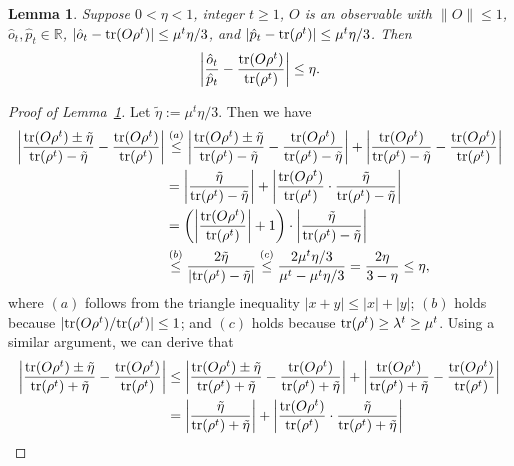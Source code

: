 \documentclass[aps,prl,twocolumn,nofootinbib,superscriptaddress,10pt]{revtex4-2}
\let\originalleft\left
\let\originalright\right
\renewcommand{\left}{\mathopen{}\mathclose\bgroup\originalleft}
\renewcommand{\right}{\aftergroup\egroup\originalright}
\def\R{ \mathbb{R} }
\newcommand{\tr}[1]{\mathrm{tr}\left( #1 \right)}
\theoremstyle{plain}
\newtheorem{lemma}{Lemma}
\theoremstyle{definition}
\newcommand{\lref}[1]{Lemma~\ref{#1}}
\begin{document}
\begin{lemma}\label{lem:PrincErrorB}
	Suppose $0<\eta<1$, integer $t\geq 1$, $O$ is an observable with $\|O\|\leq 1$, $\hat{o}_t,\hat{p}_t\in\R$, 
	$|\hat{o}_t-\tr{O\rho^t}|\leq \mu^t\eta/3$, and $|\hat{p}_t-\tr{\rho^t}|\leq \mu^t\eta/3$. Then 
	\begin{align}
		\left| \frac{\hat{o}_t}{\hat{p}_t} - \frac{\tr{O\rho^t}}{\tr{\rho^t}} \right| \leq \eta. 
	\end{align}
\end{lemma}

\begin{proof}[Proof of \lref{lem:PrincErrorB}]
	Let $\tilde\eta:=\mu^t\eta/3$. Then we have 
	\begin{align}
		\left| \frac{\tr{O\rho^t}\pm \tilde\eta }{\tr{\rho^t}-\tilde\eta} - \frac{\tr{O\rho^t}}{\tr{\rho^t}} \right|
		&
		\stackrel{(a)}{\leq} 
		\left| \frac{\tr{O\rho^t}\pm\tilde\eta }{\tr{\rho^t}-\tilde\eta}-\frac{\tr{O\rho^t} }{\tr{\rho^t}-\tilde\eta} \right|
		+ \left|\frac{\tr{O\rho^t} }{\tr{\rho^t}-\tilde\eta}-\frac{\tr{O\rho^t}}{\tr{\rho^t}} \right|
		\nonumber\\
		&=
		\left| \frac{\tilde\eta }{\tr{\rho^t}-\tilde\eta}\right|
		+ \left|\frac{ \tr{O\rho^t}}{\tr{\rho^t}} \cdot \frac{\tilde\eta }{\tr{\rho^t}-\tilde\eta}\right|
		\nonumber\\
		&= \left( \left|\frac{ \tr{O\rho^t}}{\tr{\rho^t}}\right|+1 \right)  \cdot 
		\left| \frac{\tilde\eta }{\tr{\rho^t}-\tilde\eta}\right| 
		\nonumber\\
		&\stackrel{(b)}{\leq}  \frac{2\tilde\eta }{\left|\tr{\rho^t}-\tilde\eta\right|}
		\stackrel{(c)}{\leq}  \frac{2\mu^t\eta/3 }{\mu^t-\mu^t\eta/3}
		=    \frac{2\eta}{3-\eta}
		\leq \eta,  
	\end{align}
	where $(a)$ follows from the triangle inequality $|x+y|\leq |x|+|y|$;
	$(b)$ holds because $\left|\tr{O\rho^t}/\tr{\rho^t}\right|\leq 1$; 
	and $(c)$ holds because $\tr{\rho^t}\geq \lambda^t\geq \mu^t$. 
	Using a similar argument, we can derive that
	\begin{align}
		\left| \frac{\tr{O\rho^t}\pm \tilde\eta }{\tr{\rho^t}+\tilde\eta} - \frac{\tr{O\rho^t}}{\tr{\rho^t}} \right|
		&
		\leq \left| \frac{\tr{O\rho^t}\pm\tilde\eta }{\tr{\rho^t}+\tilde\eta}-\frac{\tr{O\rho^t} }{\tr{\rho^t}+\tilde\eta} \right|
		+ \left|\frac{\tr{O\rho^t} }{\tr{\rho^t}+\tilde\eta}-\frac{\tr{O\rho^t}}{\tr{\rho^t}} \right|
		\nonumber\\
		&=
		\left| \frac{\tilde\eta }{\tr{\rho^t}+\tilde\eta}\right|
		+ \left|\frac{ \tr{O\rho^t}}{\tr{\rho^t}}\cdot \frac{\tilde\eta }{\tr{\rho^t}+\tilde\eta}\right|

\end{align}
\end{proof}
\end{document}
